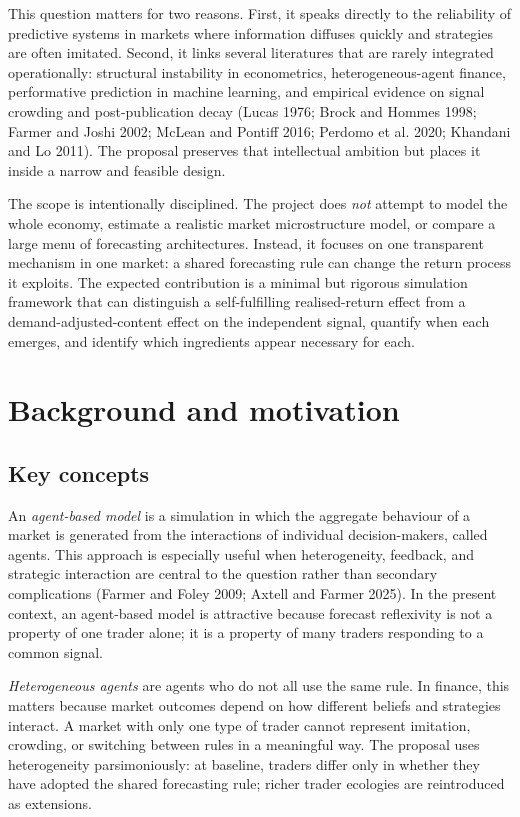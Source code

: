 \documentclass[11pt]{article}
\begin{document}
This question matters for two reasons. First, it speaks directly to the reliability of predictive systems in markets where information diffuses quickly and strategies are often imitated. Second, it links several literatures that are rarely integrated operationally: structural instability in econometrics, heterogeneous-agent finance, performative prediction in machine learning, and empirical evidence on signal crowding and post-publication decay (Lucas 1976; Brock and Hommes 1998; Farmer and Joshi 2002; McLean and Pontiff 2016; Perdomo et al. 2020; Khandani and Lo 2011). The proposal preserves that intellectual ambition but places it inside a narrow and feasible design.

The scope is intentionally disciplined. The project does \emph{not} attempt to model the whole economy, estimate a realistic market microstructure model, or compare a large menu of forecasting architectures. Instead, it focuses on one transparent mechanism in one market: a shared forecasting rule can change the return process it exploits. The expected contribution is a minimal but rigorous simulation framework that can distinguish a self-fulfilling realised-return effect from a demand-adjusted-content effect on the independent signal, quantify when each emerges, and identify which ingredients appear necessary for each.


\section{Background and motivation}

\subsection{Key concepts}

An \emph{agent-based model} is a simulation in which the aggregate behaviour of a market is generated from the interactions of individual decision-makers, called agents. This approach is especially useful when heterogeneity, feedback, and strategic interaction are central to the question rather than secondary complications (Farmer and Foley 2009; Axtell and Farmer 2025). In the present context, an agent-based model is attractive because forecast reflexivity is not a property of one trader alone; it is a property of many traders responding to a common signal.

\emph{Heterogeneous agents} are agents who do not all use the same rule. In finance, this matters because market outcomes depend on how different beliefs and strategies interact. A market with only one type of trader cannot represent imitation, crowding, or switching between rules in a meaningful way. The proposal uses heterogeneity parsimoniously: at baseline, traders differ only in whether they have adopted the shared forecasting rule; richer trader ecologies are reintroduced as extensions.
\end{document}
